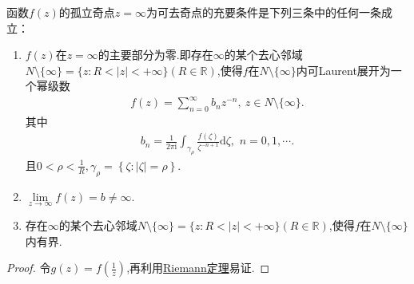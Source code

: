 \documentclass[../../main.tex]{subfiles}%
\begin{document}
\begin{theorem}\label{theorem:无穷远点为可去奇点的充要条件}
函数$f(z)$的孤立奇点$z=\infty$为可去奇点的充要条件是下列三条中的任何一条成立：
\begin{enumerate}[(1)]
\item\label{theorem:无穷远点为可去奇点的充要条件-1} $f(z)$在$z=\infty$的主要部分为零.即存在$\infty$的某个去心邻域$N\setminus \{\infty\}=\{z:R<|z|<+\infty\}(R\in \mathbb{R})$,使得\( f \)在$N\setminus \{\infty\}$内可Laurent展开为一个幂级数
\begin{align*}
f(z)=\sum_{n=0}^{\infty}{b_n z^{-n}},\ z\in N\setminus\{\infty\}.
\end{align*}
其中
\begin{align*}
b_n=\frac{1}{2\pi \mathrm{i}}\int_{\gamma _{\rho}}{\frac{f\left( \zeta \right)}{\zeta^{-n+1}}\mathrm{d}\zeta},\,\,n=0,1,\cdots .
\end{align*}
且$0 < \rho <\frac{1}{R},\gamma _{\rho}=\left\{ \zeta :\left| \zeta \right|=\rho \right\}$.

\item\label{theorem:无穷远点为可去奇点的充要条件-2} $\lim\limits_{z \to \infty}f(z)=b\neq\infty$.

\item\label{theorem:无穷远点为可去奇点的充要条件-3} 存在$\infty$的某个去心邻域$N\setminus \{\infty\}=\{z:R<|z|<+\infty\}(R\in \mathbb{R})$,使得\( f \)在$N\setminus \{\infty\}$内有界.
\end{enumerate}
\end{theorem}
\begin{proof}

令$g(z)=f\left( \frac{1}{z} \right) $,再利用\hyperref[theorem:Riemann定理-定理5.2.1]{Riemann定理}易证.

\end{proof}
\end{document}
